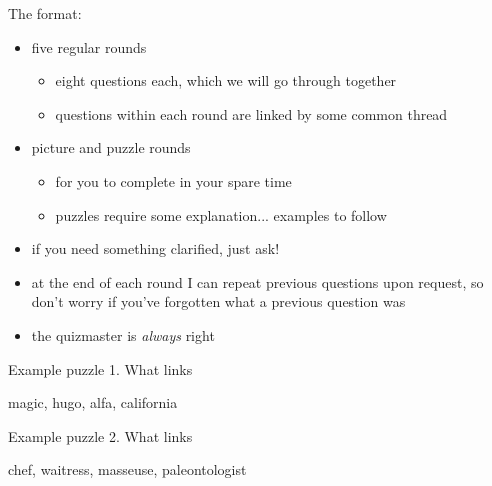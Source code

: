 \begin{frame}
   The format:
   \begin{itemize}[<+(1)->]
      \item five regular rounds
      \begin{itemize}
         \item eight questions each, which we will go through together
         \item questions within each round are linked by some common thread
      \end{itemize}
      \item picture and puzzle rounds
      \begin{itemize}
         \item for you to complete in your spare time
         \item puzzles require some explanation... examples to follow
      \end{itemize}
   \end{itemize}

   \begin{itemize}[<+(1)->]
      \item if you need something clarified, just ask!
      \item at the end of each round I can repeat previous questions upon request, so don't worry if you've forgotten what a previous question was
      \item the quizmaster is \emph{always} right
   \end{itemize}
\end{frame}

\begin{frame}
    \large
    Example puzzle 1. What links
          \begin{center}
                  magic, hugo, alfa, california
          \end{center}
\end{frame}

\begin{frame}
   \large
   Example puzzle 2. What links
   \begin{center}
                  chef, waitress, masseuse, paleontologist
   \end{center}
\end{frame}
